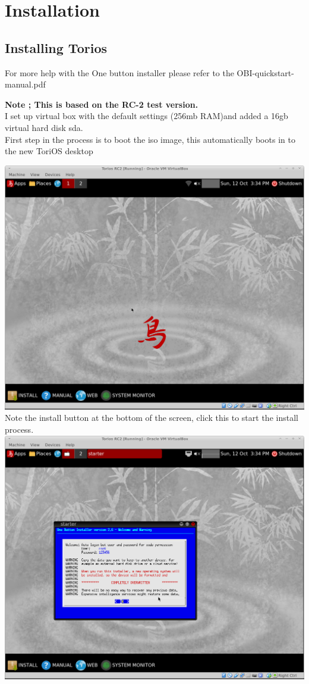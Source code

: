 \documentclass[12pt,a4paper]{book}
\begin{document}
\newpage
\section{Installation}

\subsection{Installing Torios}

For more help with the One button installer please refer to the OBI-quickstart-manual.pdf

\textbf{Note ; This is based on the RC-2 test version.}
\linebreak \\
I set up virtual box with the default settings (256mb RAM)and added a 16gb virtual hard disk sda. \\

First step in the process is to boot the iso image,  this automatically boots in to the new ToriOS desktop

\includegraphics[width=0.7\linewidth]{toriosRC2} 
\\

Note the install button at the bottom of the screen,  click this to start the install process. \\
\includegraphics[width=0.7\linewidth]{torios-rc2-install1}
\end{document}
